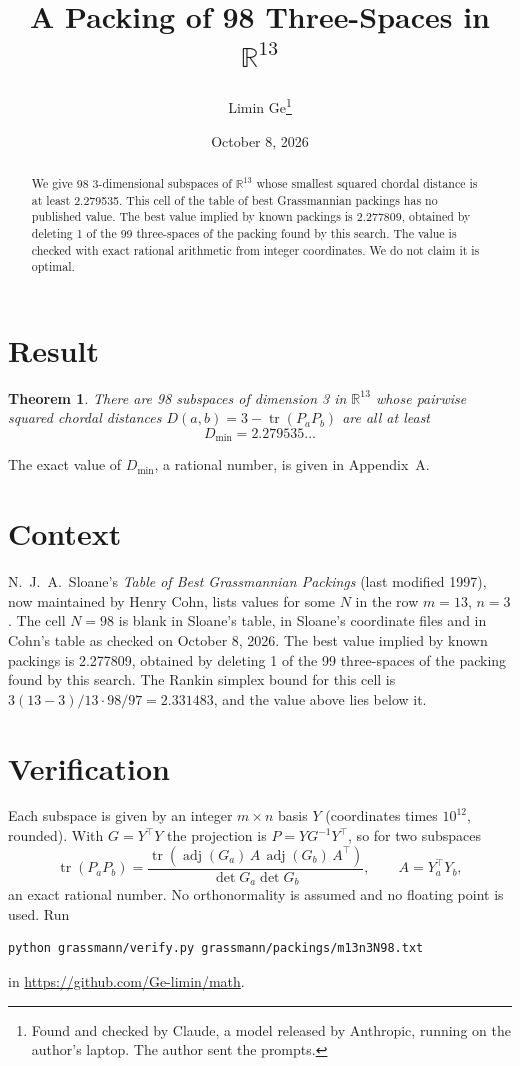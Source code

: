 \documentclass[11pt,a4paper]{article}
\title{A Packing of 98 Three-Spaces in $\mathbb{R}^{13}$}
\author{Limin Ge\thanks{Found and checked by Claude, a model released by Anthropic, running on the author's laptop. The author sent the prompts.}}
\date{October 8, 2026}
\newtheorem*{theorem}{Theorem}
\begin{document}
\maketitle
\begin{abstract}
We give 98 3-dimensional subspaces of $\mathbb{R}^{13}$ whose smallest squared chordal distance is at least 2.279535. This cell of the table of best Grassmannian packings has no published value. The best value implied by known packings is 2.277809, obtained by deleting 1 of the 99 three-spaces of the packing found by this search. The value is checked with exact rational arithmetic from integer coordinates. We do not claim it is optimal.
\end{abstract}

\section{Result}
\begin{theorem}
There are 98 subspaces of dimension 3 in $\mathbb{R}^{13}$ whose pairwise squared chordal distances $D(a,b) = 3 - \operatorname{tr}(P_aP_b)$ are all at least
\[ D_{\min} = 2.279535\ldots \]
\end{theorem}
The exact value of $D_{\min}$, a rational number, is given in Appendix~A.


\section{Context}
N.~J.~A.~Sloane's \emph{Table of Best Grassmannian Packings} (last modified 1997), now maintained by Henry Cohn, lists values for some $N$ in the row $m=13$, $n=3$. The cell $N=98$ is blank in Sloane's table, in Sloane's coordinate files and in Cohn's table as checked on October 8, 2026. The best value implied by known packings is 2.277809, obtained by deleting 1 of the 99 three-spaces of the packing found by this search. The Rankin simplex bound for this cell is $3(13-3)/13\cdot 98/97 = 2.331483$, and the value above lies below it.


\section{Verification}
Each subspace is given by an integer $m\times n$ basis $Y$ (coordinates times $10^{12}$, rounded). With $G=Y^\top Y$ the projection is $P=YG^{-1}Y^\top$, so for two subspaces
\[ \operatorname{tr}(P_aP_b)=\frac{\operatorname{tr}(\operatorname{adj}(G_a)\,A\,\operatorname{adj}(G_b)\,A^\top)}{\det G_a\det G_b},\qquad A=Y_a^\top Y_b, \]
an exact rational number. No orthonormality is assumed and no floating point is used. Run
\begin{verbatim}
python grassmann/verify.py grassmann/packings/m13n3N98.txt
\end{verbatim}
in \url{https://github.com/Ge-limin/math}.
\end{document}
